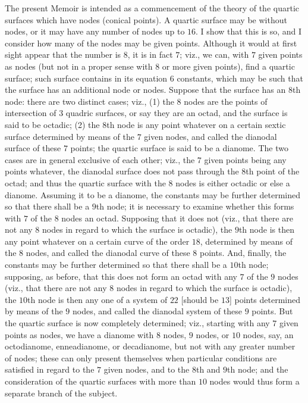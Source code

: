 \documentclass[11pt,a4paper]{article}
\begin{document}
\medskip

The present Memoir is intended as a commencement of the theory of the quartic surfaces
which have nodes (conical points). A quartic surface may be without nodes, or it may have
any number of nodes up to $16$. I show that this is so, and I consider how many of the
nodes may be given points. Although it would at first sight appear that the number is $8$,
it is in fact $7$; viz., we can, with $7$ given points as nodes (but not in a proper sense
with $8$ or more given points), find a quartic surface; such surface contains in its
equation $6$ constants, which may be such that the surface has an additional node or nodes.
Suppose that the surface has an $8$th node: there are two distinct cases; viz., (1) the $8$
nodes are the points of intersection of $3$ quadric surfaces, or say they are an octad, and
the surface is said to be octadic; (2) the $8$th node is any point whatever on a certain
sextic surface determined by means of the $7$ given nodes, and called the dianodal surface
of these $7$ points; the quartic surface is said to be a dianome. The two cases are in
general exclusive of each other; viz., the $7$ given points being any points whatever, the
dianodal surface does not pass through the $8$th point of the octad; and thus the quartic
surface with the $8$ nodes is either octadic or else a dianome. Assuming it to be a
dianome, the constants may be further determined so that there shall be a $9$th node; it
is necessary to examine whether this forms with $7$ of the $8$ nodes an octad. Supposing
that it does not (viz., that there are not any $8$ nodes in regard to which the surface is
octadic), the $9$th node is then any point whatever on a certain curve of the order $18$,
determined by means of the $8$ nodes, and called the dianodal curve of these $8$ points.
And, finally, the constants may be further determined so that there shall be a $10$th node;
supposing, as before, that this does not form an octad with any $7$ of the $9$ nodes (viz.,
that there are not any $8$ nodes in regard to which the surface is octadic), the $10$th
node is then any one of a system of $22$ [should be $13$] points determined by means of the
$9$ nodes, and called the dianodal system of these $9$ points. But the quartic surface is
now completely determined; viz., starting with any $7$ given points as nodes, we have a
dianome with $8$ nodes, $9$ nodes, or $10$ nodes, say, an octodianome, enneadianome, or
decadianome, but not with any greater number of nodes; these can only present themselves
when particular conditions are satisfied in regard to the $7$ given nodes, and to the $8$th
and $9$th node; and the consideration of the quartic surfaces with more than $10$ nodes
would thus form a separate branch of the subject.
\end{document}
